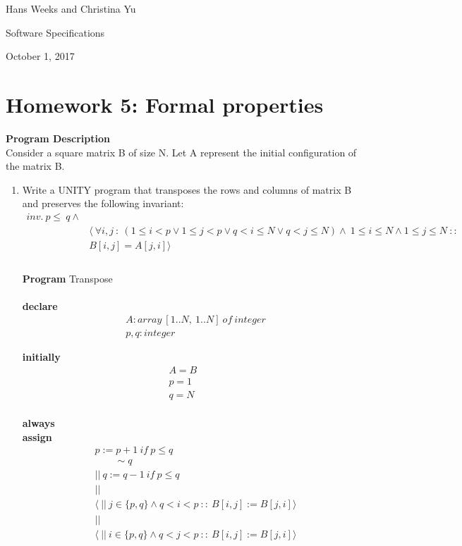 \documentclass{article}
\begin{document}
\hfill Hans Weeks and Christina Yu

\hfill Software Specifications

\hfill October 1, 2017
\section*{Homework 5: Formal properties}
\textbf{Program Description}\\
Consider a square matrix B of size N. Let A represent the initial configuration of the matrix B. \\
\begin{enumerate}
\item
Write a UNITY program that transposes the rows and columns of matrix B and preserves the following invariant:\\
\begin{align*}
 inv. \ p \leq \ q \wedge \\
&\langle \ \forall i,j \ : \ (1\leq i <p \vee 1 \leq j<p \vee q<i \leq N \vee q<j \leq N) \wedge \ 1 \leq i \leq N \wedge 1 \leq j \leq N \ :: \\ 
&B[i,j]=A[j,i]\rangle\\
\end{align*}
\\
\textbf{Program} Transpose\\
\\
\textbf{declare}\\
\begin{align*}
&A: array \ [1..N,\ 1..N]\ of \ integer\\
&p, q: integer
\end{align*}

\textbf{initially}\\
\begin{align*}
A=B\quad&\\
p=1\quad&\\
q=N\quad&\\
\end{align*}


\textbf{always}\\
\textbf{assign}\\
\begin{align*}
&p := p+1\ if \ p \leq q\\
& \quad \quad \sim q\\
&|| \ q := q-1 \ if \ p \leq q \\ 
&||\\
&\langle \ || \ j \in\{p,q\} \wedge q<i<p \ :: \ B[i,j]:=B[j,i] \rangle \\
&||\\
&\langle \ || \ i \in\{p,q\} \wedge q<j<p \ :: \ B[i,j]:=B[j,i] \rangle \\
\end{align*}



\end{enumerate}
\end{document}
